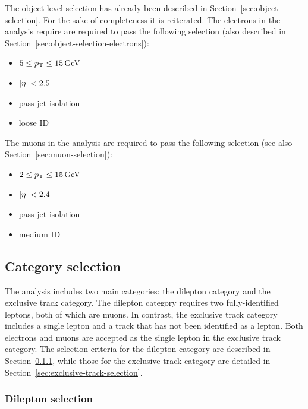 The object level selection has already been described in Section~\ref{sec:object-selection}. For the sake of completeness it is reiterated. The electrons in the analysis require are required to pass the following selection (also described in Section~\ref{sec:object-selection-electrons}):

\begin{itemize}

\item $5 \leq p_{\mathrm{T}} \leq 15\,\text{Ge\hspace{-.08em}V}$
\item $\lvert \eta \rvert < 2.5$
\item pass jet isolation
\item loose ID

\end{itemize}

The muons in the analysis are required to pass the following selection (see also Section~\ref{sec:muon-selection}):

\begin{itemize}

\item $2 \leq p_{\mathrm{T}} \leq 15\,\text{Ge\hspace{-.08em}V}$
\item $\lvert \eta \rvert < 2.4$
\item pass jet isolation
\item medium ID

\end{itemize}

\subsection{Category selection}
\label{sec:category-selection}

The analysis includes two main categories: the dilepton category and the exclusive track category. The dilepton category requires two fully-identified leptons, both of which are muons. In contrast, the exclusive track category includes a single lepton and a track that has not been identified as a lepton. Both electrons and muons are accepted as the single lepton in the exclusive track category. The selection criteria for the dilepton category are described in Section~\ref{sec:dilepton-selection}, while those for the exclusive track category are detailed in Section~\ref{sec:exclusive-track-selection}.

\subsubsection{Dilepton selection}
\label{sec:dilepton-selection}

